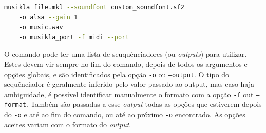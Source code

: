 \begin{lstlisting}[caption={Exemplo de um ficheiro de configuração da linguagem},label={lst:configuration-file},language=Bash]
musikla file.mkl --soundfont custom_soundfont.sf2
    -o alsa --gain 1
    -o music.wav
    -o musikla_port -f midi --port
\end{lstlisting}

O comando pode ter uma lista de seuquênciadores (ou \textit{outputs}) para utilizar. Estes devem vir sempre no fim do comando, depois de todos os argumentos e opções globais, e são identificados pela opção \texttt{-o} ou \texttt{--output}. O tipo do sequênciador é geralmente inferido pelo valor passado ao output, mas caso haja ambiguidade, é possível identificar manualmente o formato com a opção \texttt{-f} out \texttt{--format}. Também são passadas a esse \textit{output} todas as opções que estiverem depois do \texttt{-o} e até ao fim do comando, ou até ao próximo \texttt{-o} encontrado. As opções aceites variam com o formato do \textit{output}.

